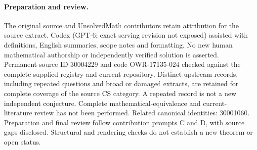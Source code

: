 \documentclass[11pt]{article}
\begin{document}
\paragraph{Preparation and review.}
The original source and UnsolvedMath contributors retain attribution for the source extract. Codex (GPT-6; exact serving revision not exposed) assisted with definitions, English summaries, scope notes and formatting. No new human mathematical authorship or independently verified solution is asserted. Permanent source ID 30004229 and code OWR-17135-024 checked against the complete supplied registry and current repository. Distinct upstream records, including repeated questions and broad or damaged extracts, are retained for complete coverage of the source CS category. A repeated record is not a new independent conjecture. Complete mathematical-equivalence and current-literature review has not been performed. Related canonical identities: 30001060. Preparation and final review follow contribution prompts C and D, with source gaps disclosed. Structural and rendering checks do not establish a new theorem or open status.
\label{end:30004229}
\end{document}
